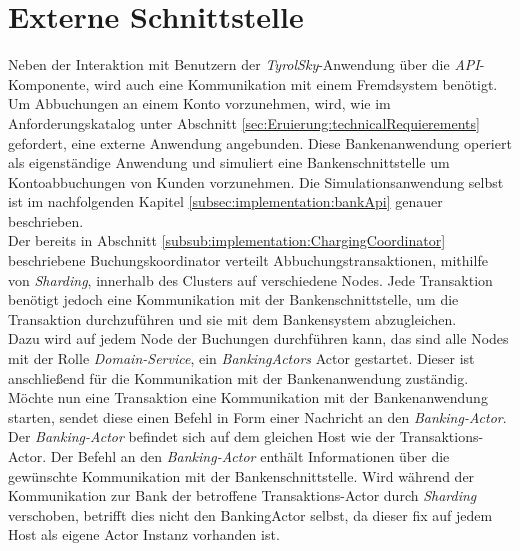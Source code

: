\section{Externe Schnittstelle}
\label{sec:implementation:externalApi}
Neben der Interaktion mit Benutzern der \textit{TyrolSky}-Anwendung über die \textit{API}-Komponente, wird auch eine Kommunikation mit einem Fremdsystem benötigt. Um Abbuchungen an einem Konto vorzunehmen, wird, wie im Anforderungskatalog unter Abschnitt \ref{sec:Eruierung:technicalRequierements} gefordert, eine externe Anwendung angebunden. Diese Bankenanwendung operiert als eigenständige Anwendung und simuliert eine Bankenschnittstelle um Kontoabbuchungen von Kunden vorzunehmen. Die Simulationsanwendung selbst ist im nachfolgenden Kapitel \ref{subsec:implementation:bankApi} genauer beschrieben. \\
Der bereits in Abschnitt \ref{subsub:implementation:ChargingCoordinator} beschriebene Buchungskoordinator verteilt Abbuchungstransaktionen, mithilfe von \textit{Sharding}, innerhalb des Clusters auf verschiedene Nodes. Jede Transaktion benötigt jedoch eine Kommunikation mit der Bankenschnittstelle, um die Transaktion durchzuführen und sie mit dem Bankensystem abzugleichen. \\
Dazu wird auf jedem Node der Buchungen durchführen kann, das sind alle Nodes mit der Rolle \textit{Domain-Service}, ein \textit{BankingActors} Actor gestartet. Dieser ist anschließend für die Kommunikation mit der Bankenanwendung zuständig. \\
Möchte nun eine Transaktion eine Kommunikation mit der Bankenanwendung starten, sendet diese einen Befehl in Form einer Nachricht an den \textit{Banking-Actor}. Der \textit{Banking-Actor} befindet sich auf dem gleichen Host wie der Transaktions-Actor. Der Befehl an den \textit{Banking-Actor} enthält Informationen über die gewünschte Kommunikation mit der Bankenschnittstelle. Wird während der Kommunikation zur Bank der betroffene Transaktions-Actor durch \textit{Sharding} verschoben, betrifft dies nicht den BankingActor selbst, da dieser fix auf jedem Host als eigene Actor Instanz vorhanden ist. 
